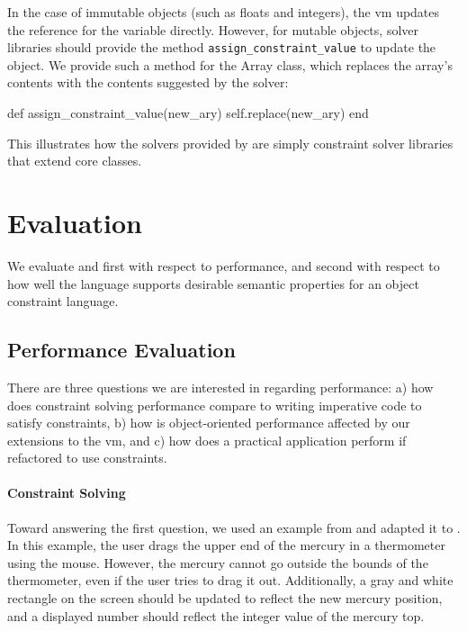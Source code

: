 In the case of immutable objects (such as floats and integers), the
\ac{vm} updates the reference for the variable directly. However, for
mutable objects, solver libraries should provide the method
\lstinline{assign_constraint_value} to update the object. We provide
such a method for the Array class, which replaces the array's contents
with the contents suggested by the solver:
\begin{code}
  def assign_constraint_value(new_ary)
    self.replace(new_ary)
  end
\end{code}

This illustrates how the solvers provided by \toolname are simply
constraint solver libraries that extend core classes.

% 


\section{Evaluation}
\label{sec:evaluation}
We evaluate \langname and \toolname first with respect to performance,
and second with respect to how well the language supports desirable
semantic properties for an object constraint language.

\subsection{Performance Evaluation}
\label{sec:performance-evaluation}

There are three questions we are interested in regarding performance:
a) how does constraint solving performance compare to writing
imperative code to satisfy constraints, b) how is object-oriented
performance affected by our extensions to the \ac{vm}, and c)
how does a practical application perform if refactored to use
constraints.

\paragraph{Constraint Solving}
Toward answering the first question, we used an example from
\cite{lopez-asi-1994} and adapted it to \toolname.  In this example,
the user drags the upper end of the mercury in a thermometer using the
mouse. However, the mercury cannot go outside the bounds of the
thermometer, even if the user tries to drag it out. Additionally, a
gray and white rectangle on the screen should be updated to reflect
the new mercury position, and a displayed number should reflect the
integer value of the mercury top.

